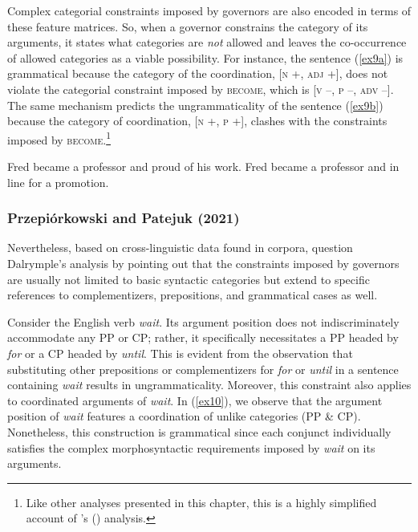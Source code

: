 Complex categorial constraints imposed by governors are also encoded in terms of these feature matrices. So, when a governor constrains the category of its arguments, it states what categories are \textit{not} allowed and leaves the co-occurrence of allowed categories as a viable possibility. For instance, the sentence (\ref{ex9a}) is grammatical because the category of the coordination, [\textsc{n} +, \textsc{adj} +], does not violate the categorial constraint imposed by \textsc{become}, which is [\textsc{v} --, \textsc{p} --, \textsc{adv} --]. The same mechanism predicts the ungrammaticality of the sentence (\ref{ex9b}) because the category of coordination, [\textsc{n} +, \textsc{p} +], clashes with the constraints imposed by \textsc{become}.\footnote{Like other analyses presented in this chapter, this is a highly simplified account of \citeauthor{Dalrymple2017}'s (\citeyear{Dalrymple2017}) analysis.}


\pex
\label{ex9}
\a\label{ex9a}Fred became a professor and proud of his work. 
\a\label{ex9b}\ljudge{*}Fred became a professor and in line for a promotion. 
\xe

\subsubsection{Przepiórkowski and Patejuk (2021)}
Nevertheless, based on cross-linguistic data found in corpora, \citet{prz:pat:21:oup} question Dalrymple's analysis by pointing out that the constraints imposed by governors are usually not limited to basic syntactic categories but extend to specific references to complementizers, prepositions, and grammatical cases as well.

Consider the English verb \textit{wait}. Its argument position does not indiscriminately accommodate any PP or CP; rather, it specifically necessitates a PP headed by \textit{for} or a CP headed by \textit{until}. This is evident from the observation that substituting other prepositions or complementizers for \textit{for} or \textit{until} in a sentence containing \textit{wait} results in ungrammaticality. Moreover, this constraint also applies to coordinated arguments of \textit{wait}. In (\ref{ex10}), we observe that the argument position of \textit{wait} features a coordination of unlike categories (PP \& CP). Nonetheless, this construction is grammatical since each conjunct individually satisfies the complex morphosyntactic requirements imposed by \textit{wait} on its arguments.

